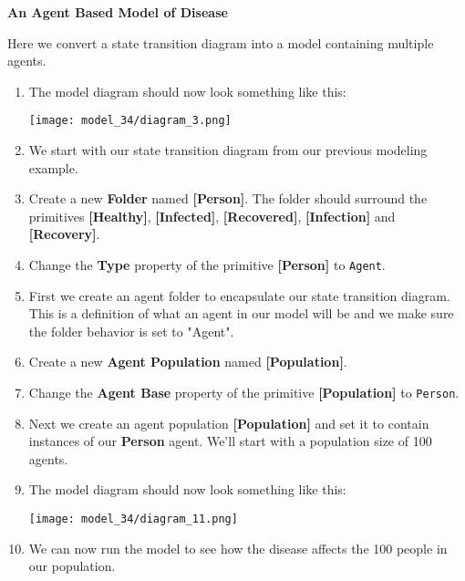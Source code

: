 \documentclass[]{memoir}
\makeatletter
\def\maxwidth{\ifdim\Gin@nat@width>\linewidth\linewidth
\else\Gin@nat@width\fi}
\let\Oldincludegraphics\includegraphics
\renewcommand{\includegraphics}[1]{\Oldincludegraphics[width=\maxwidth]{#1}}
\newcommand{\p}[1]{\textbf{{[}#1{]}}}
\newcommand{\e}[1]{\texttt{#1}}
\renewcommand{\a}[1]{\textbf{#1}}
\makeatother
\begin{document}
\FloatBarrier 

\begin{oframed}\textbf{An Agent Based Model of Disease} 

 Here we convert a state transition diagram into a model containing multiple agents.

\begin{enumerate}
\item The model diagram should now look something like this: \par \begin{minipage}{\linewidth}  \centering \texttt{[image: model\_34/diagram\_3.png]}
\end{minipage}
\item 

We start with our state transition diagram from our previous modeling example.


\item Create a new \a{Folder} named \p{Person}. The folder should surround the primitives \p{Healthy}, \p{Infected}, \p{Recovered}, \p{Infection} and \p{Recovery}.
\item  Change the \a{Type} property of the primitive \p{Person} to \e{Agent}.
\item 

First we create an agent folder to encapsulate our state transition diagram. This is a definition of what an agent in our model will be and we make sure the folder behavior is set to "Agent".


\item Create a new \a{Agent Population} named \p{Population}.
\item  Change the \a{Agent Base} property of the primitive \p{Population} to \e{Person}.
\item 

Next we create an agent population \p{Population} and set it to contain instances of our \textbf{Person} agent. We'll start with a population size of 100 agents.


\item The model diagram should now look something like this: \par \begin{minipage}{\linewidth}  \centering \texttt{[image: model\_34/diagram\_11.png]}
\end{minipage}
\item 

We can now run the model to see how the disease affects the 100 people in our population.



\end{enumerate}
\end{oframed}
\end{document}
